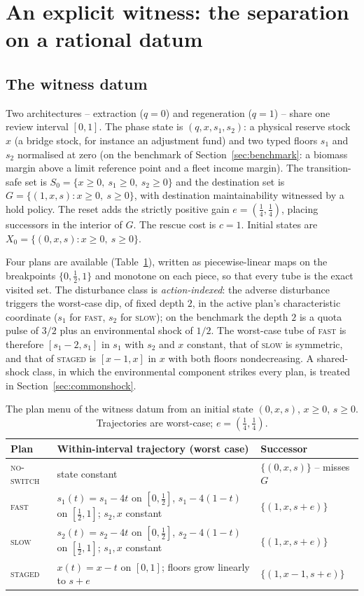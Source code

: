 \documentclass[preprint,11pt,authoryear]{elsarticle}
\theoremstyle{definition}
\theoremstyle{remark}
\newcommand{\act}[1]{\textsc{#1}}
\begin{document}
\section{An explicit witness: the separation on a rational datum}\label{sec:witness}

\subsection{The witness datum}\label{sec:datum}

Two architectures -- extraction ($q=0$) and regeneration ($q=1$) -- share one review interval $[0,1]$. The phase state is $(q,x,s_1,s_2)$: a physical reserve stock $x$ (a bridge stock, for instance an adjustment fund) and two typed floors $s_1$ and $s_2$ normalised at zero (on the benchmark of Section~\ref{sec:benchmark}: a biomass margin above a limit reference point and a fleet income margin). The transition-safe set is $S_0=\{x\ge0,\ s_1\ge0,\ s_2\ge0\}$ and the destination set is $G=\{(1,x,s):x\ge0,\ s\ge0\}$, with destination maintainability witnessed by a hold policy. The reset adds the strictly positive gain $e=(\tfrac14,\tfrac14)$, placing successors in the interior of $G$. The rescue cost is $c=1$. Initial states are $X_0=\{(0,x,s):x\ge0,\ s\ge0\}$.

Four plans are available (Table~\ref{tab:actions}), written as piecewise-linear maps on the breakpoints $\{0,\tfrac12,1\}$ and monotone on each piece, so that every tube is the exact visited set. The disturbance class is \emph{action-indexed}: the adverse disturbance triggers the worst-case dip, of fixed depth $2$, in the active plan's characteristic coordinate ($s_1$ for \act{fast}, $s_2$ for \act{slow}); on the benchmark the depth $2$ is a quota pulse of $3/2$ plus an environmental shock of $1/2$. The worst-case tube of \act{fast} is therefore $[s_1-2,s_1]$ in $s_1$ with $s_2$ and $x$ constant, that of \act{slow} is symmetric, and that of \act{staged} is $[x-1,x]$ in $x$ with both floors nondecreasing. A shared-shock class, in which the environmental component strikes every plan, is treated in Section~\ref{sec:commonshock}.

\begin{table}[!htbp]
\centering\small
\caption{The plan menu of the witness datum from an initial state $(0,x,s)$, $x\ge0$, $s\ge0$. Trajectories are worst-case; $e=(\tfrac14,\tfrac14)$.}
\label{tab:actions}
\begin{tabularx}{\textwidth}{@{}lXl@{}}
\toprule
Plan & Within-interval trajectory (worst case) & Successor \\
\midrule
\act{no-switch} & state constant & $\{(0,x,s)\}$ -- misses $G$ \\
\act{fast} & $s_1(t)=s_1-4t$ on $[0,\tfrac12]$, $s_1-4(1-t)$ on $[\tfrac12,1]$; $s_2,x$ constant & $\{(1,x,s+e)\}$ \\
\act{slow} & $s_2(t)=s_2-4t$ on $[0,\tfrac12]$, $s_2-4(1-t)$ on $[\tfrac12,1]$; $s_1,x$ constant & $\{(1,x,s+e)\}$ \\
\act{staged} & $x(t)=x-t$ on $[0,1]$; floors grow linearly to $s+e$ & $\{(1,x-1,s+e)\}$ \\
\bottomrule
\end{tabularx}
\end{table}
\end{document}
